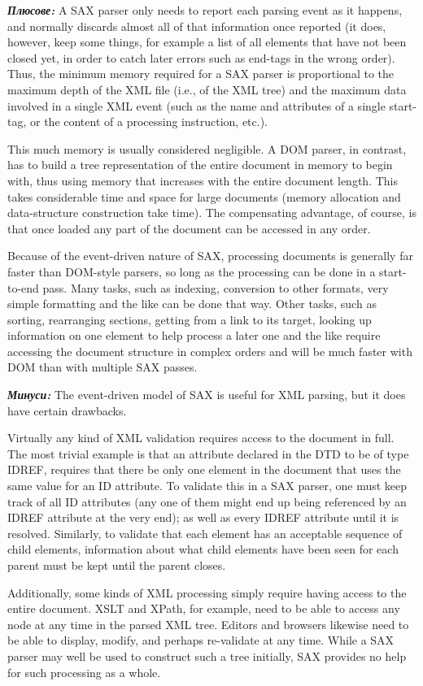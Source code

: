 \documentclass[11pt]{article} %
\begin{document}
\textit{\textbf{Плюсове: }}A SAX parser only needs to report each parsing event as it happens, and normally discards almost all of that information once reported (it does, however, keep some things, for example a list of all elements that have not been closed yet, in order to catch later errors such as end-tags in the wrong order). Thus, the minimum memory required for a SAX parser is proportional to the maximum depth of the XML file (i.e., of the XML tree) and the maximum data involved in a single XML event (such as the name and attributes of a single start-tag, or the content of a processing instruction, etc.).

This much memory is usually considered negligible. A DOM parser, in contrast, has to build a tree representation of the entire document in memory to begin with, thus using memory that increases with the entire document length. This takes considerable time and space for large documents (memory allocation and data-structure construction take time). The compensating advantage, of course, is that once loaded any part of the document can be accessed in any order.

Because of the event-driven nature of SAX, processing documents is generally far faster than DOM-style parsers, so long as the processing can be done in a start-to-end pass. Many tasks, such as indexing, conversion to other formats, very simple formatting and the like can be done that way. Other tasks, such as sorting, rearranging sections, getting from a link to its target, looking up information on one element to help process a later one and the like require accessing the document structure in complex orders and will be much faster with DOM than with multiple SAX passes.\\\par

\textit{\textbf{Минуси: }}The event-driven model of SAX is useful for XML parsing, but it does have certain drawbacks.

Virtually any kind of XML validation requires access to the document in full. The most trivial example is that an attribute declared in the DTD to be of type IDREF, requires that there be only one element in the document that uses the same value for an ID attribute. To validate this in a SAX parser, one must keep track of all ID attributes (any one of them might end up being referenced by an IDREF attribute at the very end); as well as every IDREF attribute until it is resolved. Similarly, to validate that each element has an acceptable sequence of child elements, information about what child elements have been seen for each parent must be kept until the parent closes.

Additionally, some kinds of XML processing simply require having access to the entire document. XSLT and XPath, for example, need to be able to access any node at any time in the parsed XML tree. Editors and browsers likewise need to be able to display, modify, and perhaps re-validate at any time. While a SAX parser may well be used to construct such a tree initially, SAX provides no help for such processing as a whole.
\end{document}
